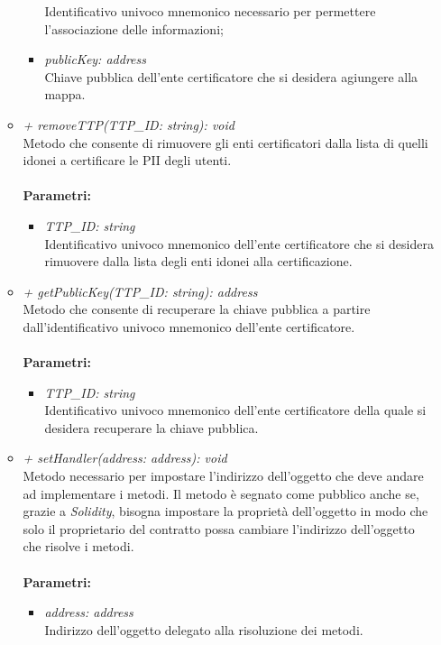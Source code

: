 \begin{itemize}
\begin{itemize}
\begin{itemize}
			Identificativo univoco mnemonico necessario per permettere l'associazione delle informazioni;
			\item \textit{publicKey: address}\\
			Chiave pubblica dell'ente certificatore che si desidera agiungere alla mappa.
		\end{itemize}
		\item \textit{+ removeTTP(TTP\_ID: string): void}\\
		Metodo che consente di rimuovere gli enti certificatori dalla lista di quelli idonei a certificare le \gls{PII} degli utenti.\\\\
		\textbf{Parametri:}
		\begin{itemize}
			\item \textit{TTP\_ID: string}\\
			Identificativo univoco mnemonico dell'ente certificatore che si desidera rimuovere dalla lista degli enti idonei alla certificazione.
		\end{itemize}
		\item \textit{+ getPublicKey(TTP\_ID: string): address}\\
		Metodo che consente di recuperare la chiave pubblica a partire dall'identificativo univoco mnemonico dell'ente certificatore.\\\\
		\textbf{Parametri:}
		\begin{itemize}
			\item \textit{TTP\_ID: string}\\
			Identificativo univoco mnemonico dell'ente certificatore della quale si desidera recuperare la chiave pubblica.
		\end{itemize}
		\item \textit{+ setHandler(address: address): void}\\
		Metodo necessario per impostare l'indirizzo dell'oggetto che deve andare ad implementare i metodi. Il metodo è segnato come pubblico anche se, grazie a \textit{Solidity}, bisogna impostare la proprietà dell'oggetto in modo che solo il proprietario del contratto possa cambiare l'indirizzo dell'oggetto che risolve i metodi.\\\\
		\textbf{Parametri:}
		\begin{itemize}
			\item \textit{address: address}\\
			Indirizzo dell'oggetto delegato alla risoluzione dei metodi.
		\end{itemize}
	\end{itemize}
\end{itemize}
\newpage
